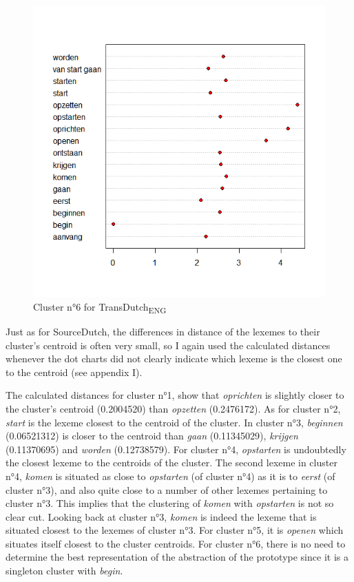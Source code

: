 \begin{figure}
\includegraphics[height=.4\textheight]{figures/Vandevoorde2-img74.png}
\caption{\label{fig:4:72}  Cluster n°6 for TransDutch\textsubscript{ENG}}
\end{figure}

Just as for SourceDutch, the differences in distance of the lexemes to their cluster’s centroid is often very small, so I again used the calculated distances whenever the dot charts did not clearly indicate which lexeme is the closest one to the centroid (see appendix I).

The calculated distances for cluster n°1, show that \textit{oprichten} is slightly closer to the cluster’s centroid (0.2004520) than \textit{opzetten} (0.2476172). As for cluster n°2, \textit{start} is the lexeme closest to the centroid of the cluster. In cluster n°3, \textit{beginnen} (0.06521312) is closer to the centroid than \textit{gaan} (0.11345029), \textit{krijgen} (0.11370695) and \textit{worden} (0.12738579). For cluster n°4, \textit{opstarten} is undoubtedly the closest lexeme to the centroids of the cluster. The second lexeme in cluster n°4, \textit{komen} is situated as close to \textit{opstarten} (of cluster n°4) as it is to \textit{eerst} (of cluster n°3), and also quite close to a number of other lexemes pertaining to cluster n°3. This implies that the clustering of \textit{komen} with \textit{opstarten} is not so clear cut. Looking back at cluster n°3, \textit{komen} is indeed the lexeme that is situated closest to the lexemes of cluster n°3. For cluster n°5, it is \textit{openen} which situates itself closest to the cluster centroids. For cluster n°6, there is no need to determine the best representation of the abstraction of the prototype since it is a singleton cluster with \textit{begin}.


